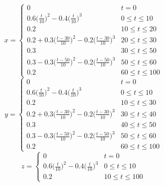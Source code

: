 \documentclass[letterpaper%
, twoside%
, 12pt%
,memoire%
, english%
,creativecommons,hyperref%
]{thETS}
\theoremstyle{newThmStyle}
\begin{document}
\begin{equation}\label{eqn:x_traj}
x=
\begin{cases} 
	  0 & t=0 \\
      0.6\big(\frac{t}{10}\big)^2 - 0.4\big(\frac{t}{10}\big)^3 & 0\leq t\leq 10 \\
      0.2 & 10\leq t\leq 20 \\
      0.2 + 0.3\big(\frac{t-30}{10}\big)^2 - 0.2\big(\frac{t-30}{10}\big)^3 & 20\leq t\leq 30 \\
      0.3 & 30\leq t\leq 50 \\
      0.3 - 0.3\big(\frac{t-50}{10}\big)^2 -  0.2\big(\frac{t-50}{10}\big)^3 & 50\leq t\leq 60 \\
      0.2 & 60\leq t\leq 100
\end{cases}
\end{equation}
\begin{equation}\label{eqn:y_traj}
y=
\begin{cases} 
	  0 & t=0 \\
      0.6\big(\frac{t}{10}\big)^2 - 0.4\big(\frac{t}{10}\big)^3 & 0\leq t\leq 10 \\
      0.2 & 10\leq t\leq 30 \\
      0.2 + 0.3\big(\frac{t-30}{10}\big)^2 - 0.2\big(\frac{t-30}{10}\big)^3 & 30\leq t\leq 40 \\
      0.3 & 40\leq t\leq 50 \\
      0.3 - 0.3\big(\frac{t-50}{10}\big)^2 -  0.2\big(\frac{t-50}{10}\big)^3 & 50\leq t\leq 60 \\
      0.2 & 60\leq t\leq 100
\end{cases}
\end{equation}
\begin{equation}\label{eqn:z_traj}
z=
\begin{cases} 
	  0 & t=0 \\
      0.6\big(\frac{t}{10}\big)^2 - 0.4\big(\frac{t}{10}\big)^3 & 0\leq t\leq 10 \\
      0.2 & 10\leq t\leq 100
\end{cases}
\end{equation}
\end{document}
